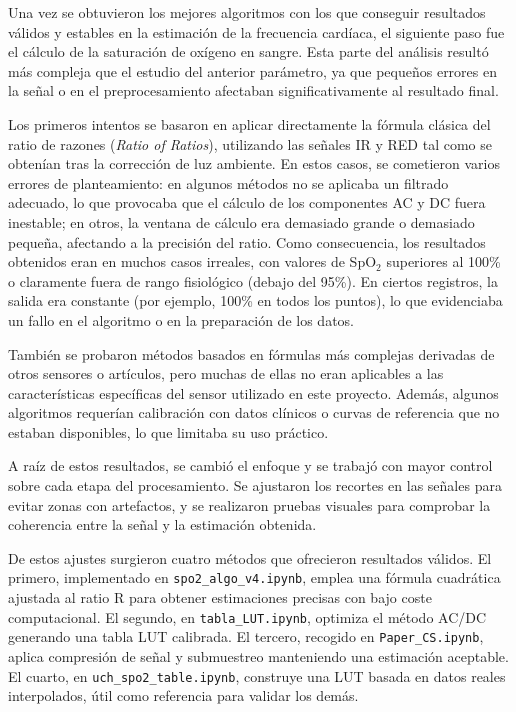 Una vez se obtuvieron los mejores algoritmos con los que conseguir resultados válidos y estables en la estimación de la frecuencia cardíaca, el siguiente paso fue el cálculo de la saturación de oxígeno en sangre. Esta parte del análisis resultó más compleja que el estudio del anterior parámetro, ya que pequeños errores en la señal o en el preprocesamiento afectaban significativamente al resultado final.

Los primeros intentos se basaron en aplicar directamente la fórmula clásica del ratio de razones (\textit{Ratio of Ratios}), utilizando las señales IR y RED tal como se obtenían tras la corrección de luz ambiente. En estos casos, se cometieron varios errores de planteamiento: en algunos métodos no se aplicaba un filtrado adecuado, lo que provocaba que el cálculo de los componentes AC y DC fuera inestable; en otros, la ventana de cálculo era demasiado grande o demasiado pequeña, afectando a la precisión del ratio. Como consecuencia, los resultados obtenidos eran en muchos casos irreales, con valores de SpO$_2$ superiores al 100\% o claramente fuera de rango fisiológico (debajo del 95\%). En ciertos registros, la salida era constante (por ejemplo, 100\% en todos los puntos), lo que evidenciaba un fallo en el algoritmo o en la preparación de los datos.

También se probaron métodos basados en fórmulas más complejas derivadas de otros sensores o artículos, pero muchas de ellas no eran aplicables a las características específicas del sensor utilizado en este proyecto. Además, algunos algoritmos requerían calibración con datos clínicos o curvas de referencia que no estaban disponibles, lo que limitaba su uso práctico.

A raíz de estos resultados, se cambió el enfoque y se trabajó con mayor control sobre cada etapa del procesamiento. Se ajustaron los recortes en las señales para evitar zonas con artefactos, y se realizaron pruebas visuales para comprobar la coherencia entre la señal y la estimación obtenida.

De estos ajustes surgieron cuatro métodos que ofrecieron resultados válidos. El primero, implementado en \texttt{spo2\_algo\_v4.ipynb}, emplea una fórmula cuadrática ajustada al ratio R para obtener estimaciones precisas con bajo coste computacional. El segundo, en \texttt{tabla\_LUT.ipynb}, optimiza el método AC/DC generando una tabla LUT calibrada. El tercero, recogido en \texttt{Paper\_CS.ipynb}, aplica compresión de señal y submuestreo manteniendo una estimación aceptable. El cuarto, en \texttt{uch\_spo2\_table.ipynb}, construye una LUT basada en datos reales interpolados, útil como referencia para validar los demás.

